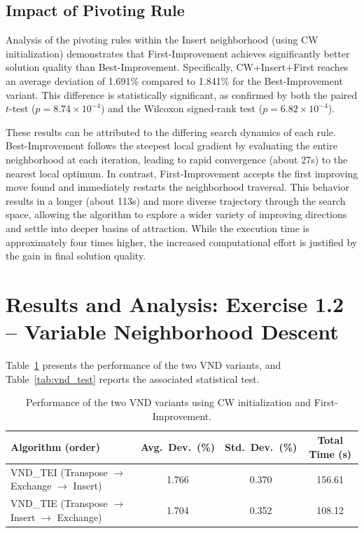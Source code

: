 \documentclass[11pt, a4paper]{article}
\begin{document}
\subsection{Impact of Pivoting Rule}

Analysis of the pivoting rules within the Insert neighborhood (using CW initialization) demonstrates that First-Improvement achieves significantly better solution quality than Best-Improvement. Specifically, CW+Insert+First reaches an average deviation of 1.691\% compared to 1.841\% for the Best-Improvement variant. This difference is statistically significant, as confirmed by both the paired $t$-test ($p = 8.74 \times 10^{-4}$) and the Wilcoxon signed-rank test ($p = 6.82 \times 10^{-4}$).

These results can be attributed to the differing search dynamics of each rule. Best-Improvement follows the steepest local gradient by evaluating the entire neighborhood at each iteration, leading to rapid convergence (about  27s) to the nearest local optimum. In contrast, First-Improvement accepts the first improving move found and immediately restarts the neighborhood traversal. This behavior results in a longer (about  113s) and more diverse trajectory through the search space, allowing the algorithm to explore a wider variety of improving directions and settle into deeper basins of attraction. While the execution time is approximately four times higher, the increased computational effort is justified by the gain in final solution quality.

\section{Results and Analysis: Exercise 1.2 -- Variable Neighborhood Descent}
\label{sec:results12}

Table~\ref{tab:vnd} presents the performance of the two VND variants, and Table~\ref{tab:vnd_test} reports the associated statistical test.

\begin{table}[h]
\centering
\caption{Performance of the two VND variants using CW initialization and First-Improvement.}
\label{tab:vnd}
\begin{tabular}{lccc}
\toprule
\textbf{Algorithm (order)} & \textbf{Avg.\ Dev.\ (\%)} & \textbf{Std.\ Dev.\ (\%)} & \textbf{Total Time (s)} \\
\midrule
VND\_TEI (Transpose $\to$ Exchange $\to$ Insert) & 1.766 & 0.370 & 156.61 \\
VND\_TIE (Transpose $\to$ Insert $\to$ Exchange) & 1.704 & 0.352 & 108.12 \\
\bottomrule
\end{tabular}
\end{table}
\end{document}
